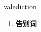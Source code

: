 
\begin{frame}
{\huge valediction}
\begin{center}
\begin{enumerate}\Large
  \item \textbf{告别词}
\end{enumerate}
\end{center}
\end{frame}
